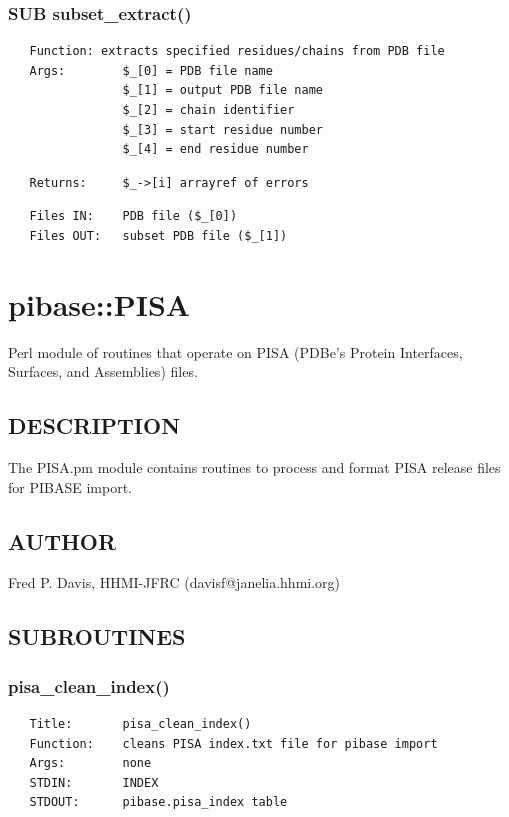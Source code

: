 \documentclass{article}
\begin{document}
\subsubsection*{SUB subset\_extract()\label{pibase::subsets_SUB_subset_extract_}}
\begin{verbatim}
   Function: extracts specified residues/chains from PDB file
   Args:        $_[0] = PDB file name
                $_[1] = output PDB file name
                $_[2] = chain identifier
                $_[3] = start residue number
                $_[4] = end residue number
\end{verbatim}
\begin{verbatim}
   Returns:     $_->[i] arrayref of errors
\end{verbatim}
\begin{verbatim}
   Files IN:    PDB file ($_[0])
   Files OUT:   subset PDB file ($_[1])
\end{verbatim}
\clearpage
\section{pibase::PISA\label{pibase::PISA}}


Perl module of routines that operate on PISA (PDBe's Protein
Interfaces, Surfaces, and Assemblies) files.

\subsection*{DESCRIPTION\label{pibase::PISA_DESCRIPTION}}


The PISA.pm module contains routines to process and format PISA release files for PIBASE import.

\subsection*{AUTHOR\label{pibase::PISA_AUTHOR}}


Fred P. Davis, HHMI-JFRC (davisf@janelia.hhmi.org)

\subsection*{SUBROUTINES\label{pibase::PISA_SUBROUTINES}}
\subsubsection*{pisa\_clean\_index()\label{pibase::PISA_pisa_clean_index_}}
\begin{verbatim}
   Title:       pisa_clean_index()
   Function:    cleans PISA index.txt file for pibase import
   Args:        none
   STDIN:       INDEX
   STDOUT:      pibase.pisa_index table
\end{verbatim}
\end{document}
